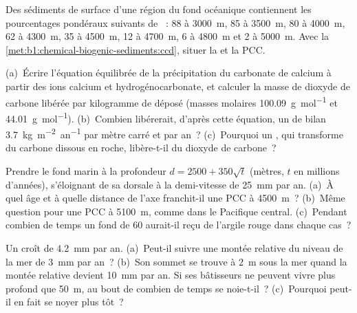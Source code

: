 \begin{exercise}[$\star$]\label{exo:b1:chemical-biogenic-sediments:4}
Des sédiments de surface d'une région du fond océanique contiennent les
pourcentages pondéraux suivants de ~: 88 à \qty{3000}{m}, 85 à \qty{3500}{m}, 80 à
\qty{4000}{m}, 62 à \qty{4300}{m}, 35 à \qty{4500}{m}, 12 à \qty{4700}{m}, 6
à \qty{4800}{m} et 2 à \qty{5000}{m}. Avec la
\cref{met:b1:chemical-biogenic-sediments:ccd}, situer la  et la PCC.
\end{exercise}

\begin{exercise}[$\star\star$]\label{exo:b1:chemical-biogenic-sediments:5}
(a)~Écrire l'équation équilibrée de la précipitation du carbonate de calcium à partir des
ions calcium et hydrogénocarbonate, et calculer la masse de dioxyde de carbone
libérée par kilogramme de  déposé (masses molaires \qty{100.09}{g.mol^{-1}}
et \qty{44.01}{g.mol^{-1}}). (b)~Combien libérerait, d'après cette
équation, un  de bilan \qty{3.7}{kg.m^{-2}.an^{-1}} par mètre carré et par an~?
(c)~Pourquoi un , qui transforme du carbone dissous en roche, libère-t-il du
dioxyde de carbone~?
\end{exercise}

\begin{exercise}[$\star\star$]\label{exo:b1:chemical-biogenic-sediments:6}
Prendre le fond marin à la profondeur $d = 2500 + 350\sqrt t$ (mètres, $t$ en
millions d'années), s'éloignant de sa dorsale à la demi-vitesse de \qty{25}{mm} par
an. (a)~À quel âge et à quelle distance de l'axe franchit-il une PCC à
\qty{4500}{m}~? (b)~Même question pour une PCC à \qty{5100}{m}, comme dans le Pacifique
central. (c)~Pendant combien de temps un fond de \qty{60}{\Ma} aurait-il reçu de l'argile rouge dans
chaque cas~?
\end{exercise}

\begin{exercise}[$\star\star$]\label{exo:b1:chemical-biogenic-sediments:7}
Un  croît de \qty{4.2}{mm} par an. (a)~Peut-il suivre une
montée relative du niveau de la mer de \qty{3}{mm} par an~? (b)~Son sommet se trouve à \qty{2}{m} sous
la mer quand la montée relative devient \qty{10}{mm} par an. Si ses bâtisseurs ne peuvent
vivre plus profond que \qty{50}{m}, au bout de combien de temps se noie-t-il~?
(c)~Pourquoi peut-il en fait se noyer plus tôt~?
\end{exercise}

